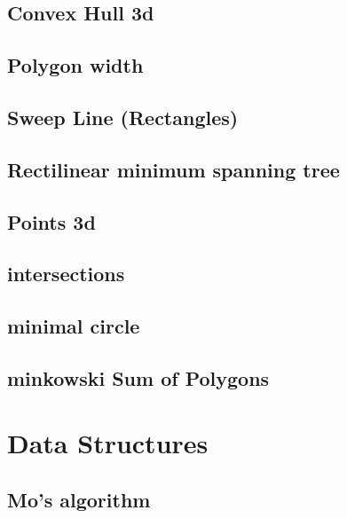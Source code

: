\subsection{Convex Hull 3d}
\raggedbottom
\hrulefill
\subsection{Polygon width}
\raggedbottom
\hrulefill
\subsection{Sweep Line (Rectangles)}
\raggedbottom
\hrulefill
\subsection{Rectilinear minimum spanning tree}
\raggedbottom
\hrulefill
\subsection{Points 3d}
\raggedbottom
\hrulefill
\subsection{intersections}
\raggedbottom
\hrulefill
\subsection{minimal circle}
\raggedbottom
\hrulefill
\subsection{minkowski Sum of Polygons}
\raggedbottom
\hrulefill

\section{Data Structures}
\subsection{Mo's algorithm}
\raggedbottom
\hrulefill
